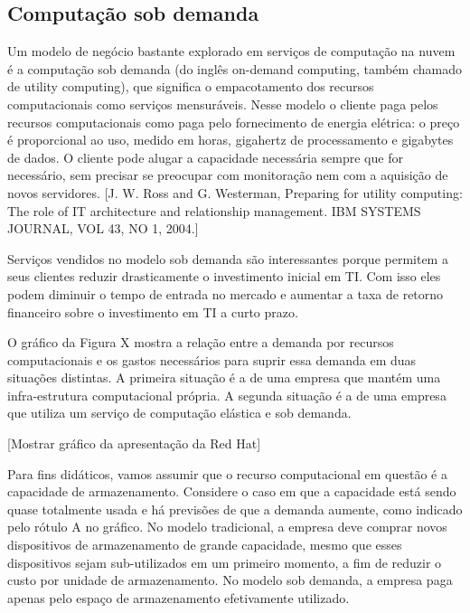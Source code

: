 
\subsection{Computação sob demanda}

Um modelo de negócio bastante explorado em serviços de computação na nuvem
é a computação sob demanda (do inglês on-demand computing, também chamado de utility computing), que significa o empacotamento dos recursos computacionais como serviços mensuráveis. Nesse modelo o cliente paga pelos recursos computacionais como paga pelo fornecimento de energia elétrica: 
o preço é proporcional ao uso, medido em horas, gigahertz de processamento e gigabytes de dados. O cliente pode alugar a capacidade necessária sempre que for necessário, sem precisar se preocupar com monitoração nem com a aquisição de novos servidores. [J. W. Ross and G. Westerman, Preparing for utility computing: The role of IT architecture and relationship management. IBM SYSTEMS JOURNAL, VOL 43, NO 1, 2004.]

Serviços vendidos no modelo sob demanda são interessantes porque permitem a seus clientes reduzir drasticamente o investimento inicial em TI. Com isso eles podem diminuir o tempo de entrada no mercado e aumentar a taxa de retorno financeiro sobre o investimento em TI a curto prazo.

O gráfico da Figura X mostra a relação entre a demanda por recursos computacionais e os gastos necessários para suprir essa demanda em duas situações distintas. A primeira situação é a de uma empresa que mantém uma infra-estrutura computacional própria. A segunda situação é a de uma empresa que utiliza um serviço de computação elástica e sob demanda.

[Mostrar gráfico da apresentação da Red Hat]

Para fins didáticos, vamos assumir que o recurso computacional em questão é a capacidade de armazenamento. Considere o caso em que a capacidade está sendo quase totalmente usada e há previsões de que a demanda aumente, como indicado pelo rótulo A no gráfico. No modelo tradicional, a empresa deve comprar novos dispositivos de armazenamento de grande capacidade,
mesmo que esses dispositivos sejam sub-utilizados em um primeiro momento,
a fim de reduzir o custo por unidade de armazenamento. No modelo sob demanda, a empresa paga apenas pelo espaço de armazenamento efetivamente utilizado.

